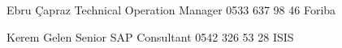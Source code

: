 

\begin{cvhonors}

  \cvhonor
    {Ebru Çapraz} %
    {Technical Operation Manager } %
    {0533 637 98 46} %
    {Foriba} %

  \cvhonor
    {Kerem Gelen} %
    {Senior SAP Consultant} %
    {0542 326 53 28} %
    {ISIS} %

\end{cvhonors}
